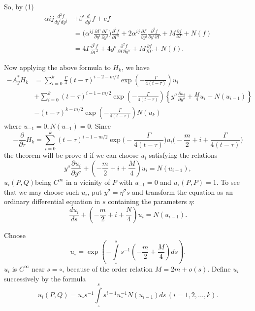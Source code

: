 So, by (1)
\begin{align*}
\alpha ij \frac{d^2 f}{dy^idy^j}& + \beta^i \frac{d}{dy^i}f+ef\\
 &= \bigg( \alpha^{ij} \frac{\partial \Gamma}{\partial y^i}
 \frac{\partial \Gamma}{\partial y^j} \bigg) \frac{\partial^2
  f}{\partial \Gamma^2}+ 2 \alpha^{ij} \frac{\partial
  \Gamma}{\partial y^j} \frac{\partial^2 f}{\partial y^i \partial
  \Gamma}+ M \frac {\partial f}{\partial \Gamma}+N(f)\\ 
 &=4 \Gamma \frac{\partial^2 f}{\partial \Gamma^2}+4 y^\sigma
 \frac{\partial^2 f}{\partial \Gamma \partial y^\sigma}+M
 \frac{\partial f}{\partial \Gamma}+N (f). 
\end{align*}

Now applying the above formula to $H_k$, we have 
\begin{align*}
 -A^*_yH_k &= \sum^k_{i=0} \frac{\Gamma}{4} (t- \tau)^{i-2-m/2}\exp
 \left(-\frac {\Gamma}{4(t- \tau)} \right )u_i\\ 
 &+\sum^k_{i=0}(t- \tau)^{i-1-m/2}\exp \left(-\frac {\Gamma}{4(t-
  \tau)} \right) \left\{ y^\sigma \frac{\partial u_i}{\partial
  y^\sigma}+\frac{M}{4}u_i -N(u_{i-1})\right\}\\ 
 &-(t- \tau)^{k-m/2}\exp \left(-\frac {\Gamma}{4(t- \tau)}\right)N(u_k) 
\end{align*}
where $u_{-1}=0,N(u_{-1})=0$. Since 
$$
-\frac{\partial}{\partial \tau}H_k= \sum^k_{i=0}(t-\tau)^{i-1-m/2}
\exp \bigg (-\frac {\Gamma}{4(t- \tau)} \bigg ) u_i \bigg
(-\frac{m}{2}+i+\frac {\Gamma}{4(t- \tau)} \bigg ) 
$$
the theorem will be prove d if we can choose $u_i$ satisfying the relations 
$$
y^\sigma \frac{\partial u_i}{\partial y^\sigma}+
\left(-\frac{m}{2}+i+\frac{M}{4}\right)u_i=N (u_{i-1}), 
$$
$u_i(P,Q)$\pageoriginale being $C^\infty$ in a vicinity of $P$ with $u_{-1}=0$ and
$u_\circ (P,P)=1$. To see that we may choose such $u_i$, put
$y^\sigma= \eta^\sigma s$ and transform the equation as an ordinary
differential equation in $s$ containing the parameters $\eta$: 
$$
\frac{d u_i}{ds} +\left(-\frac{m}{2}+i+ \frac{N}{4}\right)u_i=N (u_{i-1}).
$$

Choose
$$
u_ \circ =\exp \left(-\int \limits^s_\circ
s^{-1}\left(-\frac{m}{2}+\frac{M}{4}\right)ds\right).
$$
$u_i$ is $C^\infty$ near $s= \circ$, because of the order relation
$M=2m+o(s)$. Define $u_i$ successively by the formula 
$$
u_i (P,Q)=u_ \circ s^{-1} \int \limits^s_ \circ s^{i-1}u^{-1}_ \circ
N(u_{i-1})ds\, (i=1,2,\ldots, k). 
$$
